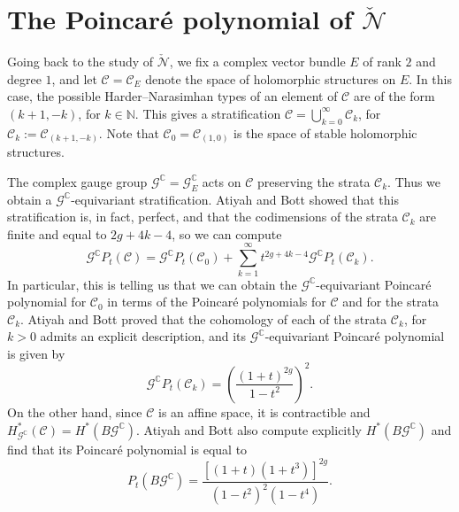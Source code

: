 \documentclass[12pt,a4paper]{amsbook}
\theoremstyle{remark} \newtheorem{rmk}[thm]{Remark}
\theoremstyle{definition} \newtheorem{defn}[thm]{Definition}
\theoremstyle{definition} \newtheorem{ex}[thm]{Example}
\theoremstyle{definition} \newtheorem{ej}{Exercise}
\newcommand{\C}{\mathbb C}
\newcommand{\cC}{\mathcal C}
\newcommand{\cG}{\mathcal G}
\newcommand{\cN}{\mathcal N}
\begin{document}
\section{The Poincaré polynomial of $\check{\cN}$}
Going back to the study of $\check{\cN}$, we fix a complex vector bundle $E$ of rank $2$ and degree $1$, and let $\cC=\cC_E$ denote the space of holomorphic structures on $E$. In this case, the possible Harder--Narasimhan types of an element of $\cC$ are of the form $(k+1,-k)$, for $k\in \mathbb{N}$. This gives a stratification $\cC=\bigcup_{k=0}^\infty \cC_k$, for $\cC_k:=\cC_{(k+1,-k)}$. Note that $\cC_0=\cC_{(1,0)}$ is the space of stable holomorphic structures.

The complex gauge group $\cG^\C=\cG^\C_E$ acts on $\cC$ preserving the strata $\cC_k$. Thus we obtain a $\cG^\C$-equivariant stratification. Atiyah and Bott \cite{AtiyahBott} showed that this stratification is, in fact, perfect, and that the codimensions of the strata $\cC_k$ are finite and equal to $2g+4k-4$, so we can compute
\begin{equation*}
\cG^\C P_t(\cC) = \cG^\C P_t(\cC_0) + \sum^\infty_{k=1} t^{2g+4k-4} \cG^\C P_t(\cC_k).
\end{equation*}
In particular, this is telling us that we can obtain the $\cG^\C$-equivariant Poincaré polynomial for $\cC_0$ in terms of the Poincaré polynomials for $\cC$ and for the strata $\cC_k$. Atiyah and Bott proved that the cohomology of each of the strata $\cC_k$, for $k>0$ admits an explicit description, and its $\cG^\C$-equivariant Poincaré polynomial is given by
\begin{equation*}
\cG^\C P_t(\cC_k) = \left( \frac{(1+t)^{2g}}{1-t^2} \right)^2.
\end{equation*}
On the other hand, since $\cC$ is an affine space, it is contractible and $H^*_{\cG^\C}(\cC)=H^*(B\cG^\C)$. Atiyah and Bott also compute explicitly $H^*(B\cG^\C)$ and find that its Poincaré polynomial is equal to
\begin{equation*}
P_t(B\cG^\C) = \frac{[(1+t)(1+t^3)]^{2g}}{(1-t^2)^2(1-t^4)}.
\end{equation*}
\end{document}
